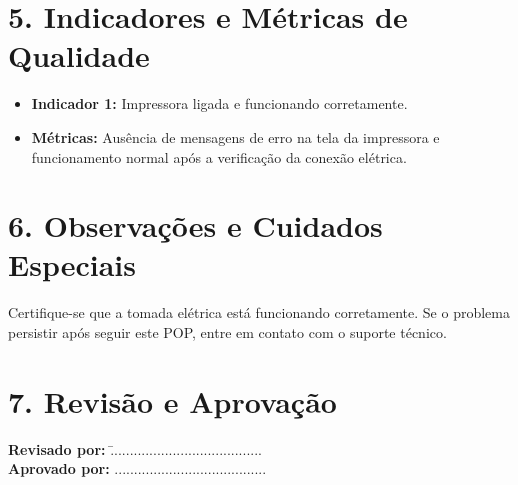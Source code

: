 \documentclass[a4paper,12pt]{article}
\begin{document}
\section*{5. Indicadores e Métricas de Qualidade}
\begin{itemize}
    \item \textbf{Indicador 1:} Impressora ligada e funcionando corretamente.
    \item \textbf{Métricas:}  Ausência de mensagens de erro na tela da impressora e funcionamento normal após a verificação da conexão elétrica.
\end{itemize}

\section*{6. Observações e Cuidados Especiais}
Certifique-se que a tomada elétrica está funcionando corretamente.  Se o problema persistir após seguir este POP, entre em contato com o suporte técnico.

\section*{7. Revisão e Aprovação}
\begin{tabbing}
    \hspace{5cm} \= \textbf{Revisado por:} \hspace{2cm} \= ....................................... \\
    \hspace{5cm} \> \textbf{Aprovado por:} \> ....................................... \\
\end{tabbing}
\end{document}
